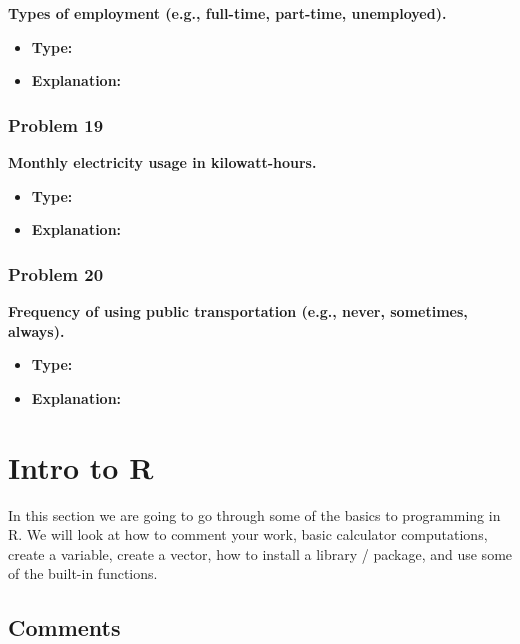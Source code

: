 \documentclass[
  letterpaper,
  DIV=11,
  numbers=noendperiod]{scrreprt}
\begin{document}
\textbf{Types of employment (e.g., full-time, part-time, unemployed).}

\begin{itemize}
\item
  \textbf{Type:}
\item
  \textbf{Explanation:}
\end{itemize}

\subsection*{Problem 19}\label{problem-19}

\textbf{Monthly electricity usage in kilowatt-hours.}

\begin{itemize}
\item
  \textbf{Type:}
\item
  \textbf{Explanation:}
\end{itemize}

\subsection*{Problem 20}\label{problem-20}

\textbf{Frequency of using public transportation (e.g., never,
sometimes, always).}

\begin{itemize}
\item
  \textbf{Type:}
\item
  \textbf{Explanation:}
\end{itemize}


\chapter*{Intro to R}\label{intro-to-r}


In this section we are going to go through some of the basics to
programming in R. We will look at how to comment your work, basic
calculator computations, create a variable, create a vector, how to
install a library / package, and use some of the built-in functions.

\section*{Comments}\label{comments}
\end{document}
